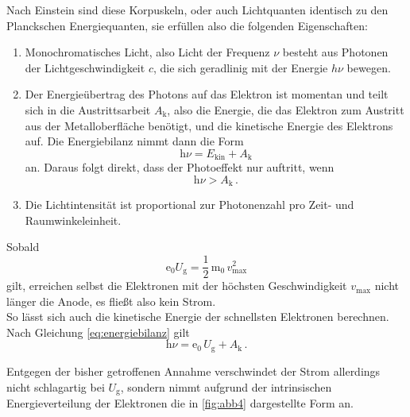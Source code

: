 Nach Einstein sind diese Korpuskeln, oder auch Lichtquanten identisch zu den Planckschen Energiequanten,
sie erfüllen also die folgenden Eigenschaften:

\begin{enumerate}
    \item Monochromatisches Licht, also Licht der Frequenz $\nu$ besteht aus Photonen der Lichtgeschwindigkeit $c$,
            die sich geradlinig mit der Energie $h\nu$ bewegen.
    \item Der Energieübertrag des Photons auf das Elektron ist momentan und teilt sich in die Austrittsarbeit $A_\text{k}$, 
            also die Energie, die das Elektron zum Austritt aus der Metalloberfläche benötigt, 
            und die kinetische Energie des Elektrons auf. Die Energiebilanz nimmt dann die 
            Form
            \begin{equation}
                \text{h} \nu = E_\text{kin} + A_\text{k}
                \label{eq:energiebilanz}
            \end{equation}
            an.
            Daraus folgt direkt, dass der Photoeffekt nur auftritt, wenn
            \begin{equation*}
                \text{h} \nu > A_\text{k} \,.
            \end{equation*}
    \item Die Lichtintensität ist proportional zur Photonenzahl pro Zeit- und Raumwinkeleinheit.
\end{enumerate}


Sobald
\begin{equation*}
    \text{e}_0 U_\text{g} = \dfrac{1}{2} \, \text{m}_0 \, v^2_\text{max}
\end{equation*}
gilt, erreichen selbst die Elektronen mit der höchsten Geschwindigkeit $v_\text{max}$ nicht länger die Anode, es fließt also kein Strom. \\

So lässt sich auch die kinetische Energie der schnellsten Elektronen berechnen.
Nach Gleichung \eqref{eq:energiebilanz} gilt
\begin{equation*}
    \text{h} \nu = \text{e}_0 \,U_\text{g} + A_\text{k} \,.
\end{equation*}

Entgegen der bisher getroffenen Annahme verschwindet der Strom allerdings nicht schlagartig bei $U_\text{g}$, sondern nimmt aufgrund der intrinsischen Energieverteilung der Elektronen die in \autoref{fig:abb4}
dargestellte Form an.

